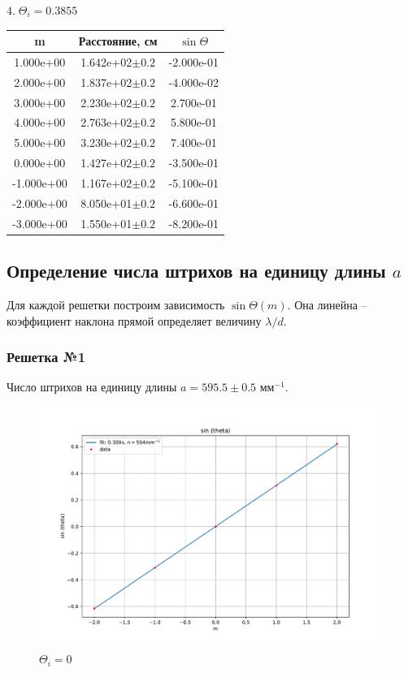 \documentclass[a4paper, 12pt]{article}
\begin{document}
$4.\; \Theta_i = 0.3855$\\
\begin{center}
\begin{tabular}{| c| c | c |}
\hline
m  &  Расстояние, см & $\sin\Theta $\\ 
\hline
 1.000e+00 & 1.642e+02$\pm0.2$  &-2.000e-01 \\
 2.000e+00 & 1.837e+02$\pm0.2$  &-4.000e-02 \\
 3.000e+00 & 2.230e+02$\pm0.2$  & 2.700e-01 \\
 4.000e+00 & 2.763e+02$\pm0.2$  & 5.800e-01 \\
 5.000e+00 & 3.230e+02$\pm0.2$  & 7.400e-01 \\
 0.000e+00 & 1.427e+02$\pm0.2$  &-3.500e-01 \\
-1.000e+00 & 1.167e+02$\pm0.2$  &-5.100e-01 \\
-2.000e+00 & 8.050e+01$\pm0.2$  &-6.600e-01 \\
-3.000e+00 & 1.550e+01$\pm0.2$  &-8.200e-01 \\
\hline
\end{tabular}
\end{center}






\subsection{Определение числа штрихов на единицу длины $a$}

Для каждой решетки построим зависимость $\sin\Theta(m)$. Она линейна -- коэффициент наклона прямой определяет величину $\lambda/d$.

\subsubsection{Решетка №1}
Число штрихов на единицу длины $a =595.5 \pm 0.5 \text{ мм}^{-1}$.

\begin{figure}[H]
	\centering
	\includegraphics[scale=0.5]{1_0}
	\caption{$\Theta_i = 0$}
\end{figure}
\end{document}
